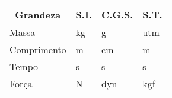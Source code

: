 \begin{table}[H]
	\centering
	\begin{tabular}{|l|l|l|l|}
		\hline
		\multicolumn{1}{|c|}{Grandeza} & \multicolumn{1}{c|}{S.I.} & \multicolumn{1}{c|}{C.G.S.} & \multicolumn{1}{c|}{S.T.} \\ \hline
		Massa       & kg & g    & utm \\ \hline
		Comprimento & m  & cm   & m   \\ \hline
		Tempo       & s  & s    & s   \\ \hline
		Força       & N  & dyn & kgf \\ \hline
	\end{tabular}
\end{table}